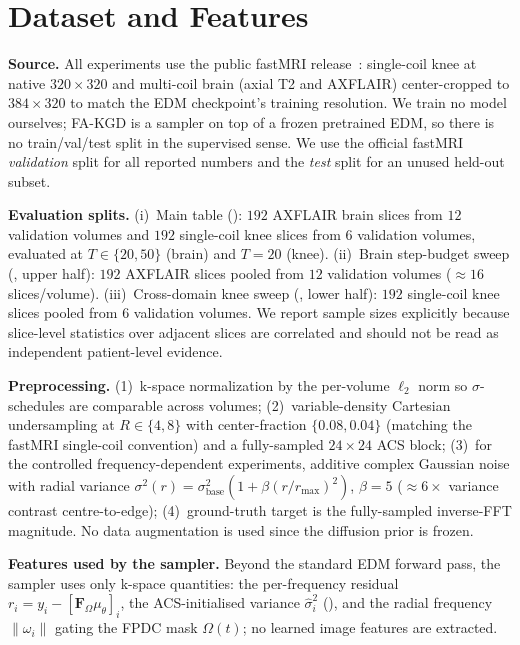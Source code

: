 \documentclass[10pt,twocolumn,letterpaper]{article}
\newcommand{\hatsig}{\hat{\sigma}}
\newcommand{\muth}{\mu_\theta}
\begin{document}
\section{Dataset and Features}
\label{sec:dataset}

\textbf{Source.} All experiments use the public fastMRI
release~\cite{zbontar2018fastmri}: single-coil knee at native
$320\times320$ and multi-coil brain (axial T2 and AXFLAIR) center-cropped to
$384\times320$ to match the EDM checkpoint's training resolution. We train no
model ourselves; FA-KGD is a sampler on top of a frozen pretrained EDM, so
there is no train/val/test split in the supervised sense. We use the official
fastMRI \emph{validation} split for all reported numbers and the \emph{test}
split for an unused held-out subset.

\textbf{Evaluation splits.}
(i)~Main table (): $192$ AXFLAIR brain slices from $12$
validation volumes and $192$ single-coil knee slices from $6$ validation
volumes, evaluated at $T{\in}\{20,50\}$ (brain) and $T{=}20$ (knee).
(ii)~Brain step-budget sweep (, upper half): $192$ AXFLAIR
slices pooled from $12$ validation volumes ($\approx 16$ slices/volume).
(iii)~Cross-domain knee sweep (, lower half): $192$
single-coil knee slices pooled from $6$ validation volumes.
We report sample sizes explicitly because slice-level statistics over adjacent
slices are correlated and should not be read as independent patient-level
evidence.

\textbf{Preprocessing.}
(1)~k-space normalization by the per-volume $\ell_2$ norm so $\sigma$-schedules
are comparable across volumes;
(2)~variable-density Cartesian undersampling at $R\in\{4,8\}$ with
center-fraction $\{0.08,0.04\}$ (matching the fastMRI single-coil convention)
and a fully-sampled $24{\times}24$ ACS block;
(3)~for the controlled frequency-dependent experiments, additive complex
Gaussian noise with radial variance
$\sigma^2(r)=\sigma_{\text{base}}^2(1{+}\beta(r/r_{\max})^2)$, $\beta{=}5$
(${\approx}6\times$ variance contrast centre-to-edge);
(4)~ground-truth target is the fully-sampled inverse-FFT magnitude.
No data augmentation is used since the diffusion prior is frozen.

\textbf{Features used by the sampler.} Beyond the standard EDM forward pass,
the sampler uses only k-space quantities: the per-frequency residual
$r_i = y_i-[\mathbf{F}_\Omega\muth]_i$, the ACS-initialised variance
$\hatsig_i^2$ (), and the radial
frequency $\|\omega_i\|$ gating the FPDC mask $\Omega(t)$; no learned image
features are extracted.
\end{document}
